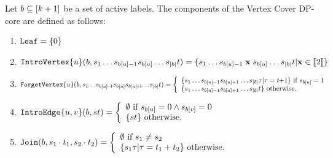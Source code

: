\begin{definition} \label{VCDP-core}
Let $b \subseteq [k+1]$ be a set of active labels. The components of the {\sc Vertex Cover} DP-core are defined as follows:
\begin{enumerate}

\item \label{VCDP-coreLeaf}$\texttt{Leaf} = \{0\}$

\item \label{VCDP-coreIntroVertex}$\texttt{IntroVertex}\{u\}(b,s_1\dots s_{b[u]-1}s_{b[u]}\dots s_{|b|} t)\\ = \{s_1\dots s_{b[u]-1}\thickspace\textbf{x}\thickspace s_{b[u]}\dots s_{|b|} t | \textbf{x} \in \llbracket 2 \rrbracket\}$

\item \label{VCDP-coreForgetVertex}$\forgetvertex{\activelabelu}(\activelabels,s_1\negthickspace\dots\negthinspace s_{\activelabels[\activelabelu]\negthinspace-\negthinspace1}s_{\activelabels[\activelabelu]}s_{\activelabels[\activelabelu]\negthinspace+\negthinspace1}\negthickspace\dots\negthinspace s_{|\activelabels|} t) \\ = 
\left\{\begin{array}{l}
\{s_1\dots s_{\activelabels[\activelabelu]-1}s_{\activelabels[\activelabelu]+1}\dots s_{|\activelabels|} \tau | \tau = t\negthickspace+\negmedspace1\} \mbox{ if $s_{\activelabels[\activelabelu]} = 1$} \\
\{s_1\dots s_{\activelabels[\activelabelu]-1}s_{\activelabels[\activelabelu]+1}\dots s_{|\activelabels|} t\} \mbox{ otherwise.} 
\end{array}\right. $


\item \label{VCDP-coreIntroEdge}$\texttt{IntroEdge}\{u,v\}(b,st)\\ = \left\{\begin{array}{l}
\emptyset \mbox{ if $ s_{b[u]} = 0 \land s_{b[v]} = 0 $} \\ 
\{st\} \mbox{ otherwise.} 
\end{array}\right. $


\item \label{VCDP-coreJoin}$\texttt{Join}(b, s_1\cdot t_1,s_2\cdot t_2) \\= \left\{
\begin{array}{l}
\emptyset \mbox{ if $s_1\neq s_2$} \\ 
\{s_1\tau | \tau = t_1 + t_2\} \mbox{ otherwise.} 
\end{array}\right.$

\end{enumerate}

\end{definition}



